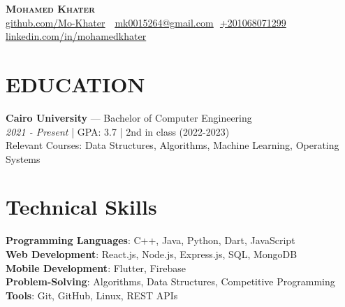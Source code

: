 \documentclass[letterpaper,11pt]{article}
\begin{document}
\begin{flushright}
  \vspace{-4pt}
\end{flushright}

\vspace{-7pt}

\begin{center}
    \textbf{\Huge \scshape Mohamed Khater} \\ \vspace{8pt}
    \small 
    \faGithub
    \href{https://github.com/Mo-Khater}{\underline{github.com/Mo-Khater}} $  $
    \faEnvelope$  $
    \href{mailto:mk0015264@gmail.com}
    {\underline{mk0015264@gmail.com}}
    \faPhone$  $
    \underline{+201068071299}
    \faLinkedin$  $
    \href{https://www.linkedin.com/in/mohamed-khater-924782243/}{\underline{linkedin.com/in/mohamedkhater}} $  $
\end{center}

\section{EDUCATION}
\begin{itemize}[leftmargin=0.15in, label={}]
    \normalsize{\item{
        \textbf{Cairo University}{ --- Bachelor of Computer Engineering} \\ 
        \textit{2021 - Present} | GPA: 3.7 | 2nd in class (2022-2023) \\ 
        Relevant Courses: Data Structures, Algorithms, Machine Learning, Operating Systems
    }}
\end{itemize}

\section{Technical Skills}
 \begin{itemize}[leftmargin=0.15in, label={}]
    \small{\item{
    
     \textbf{Programming Languages}{: C++, Java, Python, Dart, JavaScript} \\
     \textbf{Web Development}{: React.js, Node.js, Express.js, SQL, MongoDB} \\
     
     \textbf{Mobile Development}{: Flutter, Firebase} \\

     \textbf{Problem-Solving}{: Algorithms, Data Structures, Competitive Programming} \\
     \textbf{Tools}{: Git, GitHub, Linux, REST APIs} \\
     
    }}
 \end{itemize}
\end{document}
